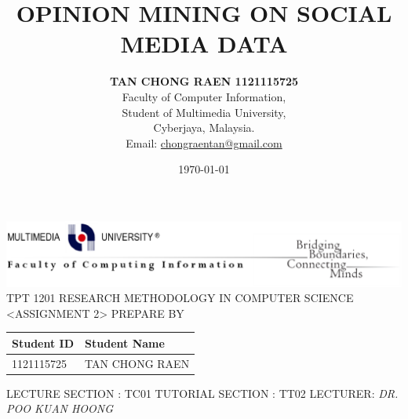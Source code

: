\documentclass[a4paper,12pt]{article}
\title{\textbf{OPINION MINING ON SOCIAL MEDIA DATA}}
\author{
\textbf{TAN CHONG RAEN 1121115725}\\Faculty of Computer Information, \\Student of Multimedia University, \\Cyberjaya, Malaysia.\\ Email: \url{chongraentan@gmail.com}
}
\date{\today}
\begin{document}
\thispagestyle{empty}
\begin{center}
\includegraphics[width=18cm]{mmu.eps}
\break\break\break\break
\Huge
TPT 1201\break\break
RESEARCH METHODOLOGY \break
IN \break
COMPUTER SCIENCE \break\break\break\break
\textless ASSIGNMENT 2\textgreater \break\break\break\break 
\Large
PREPARE BY \break\break
\begin{tabular}{| m{7.5cm} | m{9cm} |}
\hline
\hspace{2.3cm}Student ID &\hspace{2.5cm}Student Name \\
\hline
\hspace{2.05cm}1121115725 &\hspace{1.5cm} TAN CHONG RAEN \\
\hline
\end{tabular}
\break\break
LECTURE SECTION \hspace{5mm}: TC01\break
TUTORIAL SECTION \hspace{2mm}: TT02\break
LECTURER: \textit{DR. POO KUAN HOONG}
\end{center}



\restoregeometry
\maketitle
\newpage
\thispagestyle{empty}
\tableofcontents
\thispagestyle{empty}

\linespread{1.5}
\newpage
\setcounter{page}{1}
\end{document}
